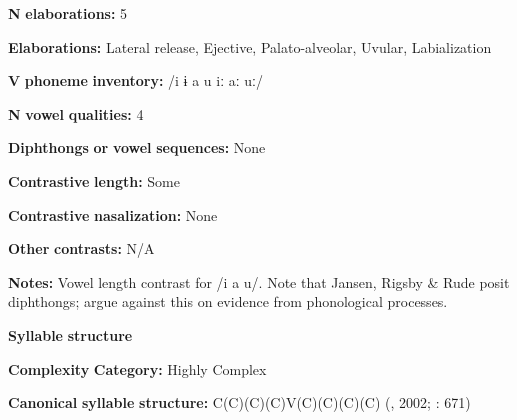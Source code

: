 \begin{styleBody}
\textbf{N} \textbf{elaborations:} 5
\end{styleBody}

\begin{styleBody}
\textbf{Elaborations:} Lateral release, Ejective, Palato-alveolar, Uvular, Labialization
\end{styleBody}

\begin{styleBody}
\textbf{V} \textbf{phoneme} \textbf{inventory:} /i ɨ a u iː aː uː/
\end{styleBody}

\begin{styleBody}
\textbf{N} \textbf{vowel} \textbf{qualities:} 4
\end{styleBody}

\begin{styleBody}
\textbf{Diphthongs} \textbf{or} \textbf{vowel} \textbf{sequences:} None
\end{styleBody}

\begin{styleBody}
\textbf{Contrastive} \textbf{length:} Some
\end{styleBody}

\begin{styleBody}
\textbf{Contrastive} \textbf{nasalization:} None
\end{styleBody}

\begin{styleBody}
\textbf{Other} \textbf{contrasts:} N/A
\end{styleBody}

\begin{styleBody}
\textbf{Notes:} Vowel length contrast for /i a u/. Note that Jansen, Rigsby \& Rude posit diphthongs; \citet{HargusBeavert2006} argue against this on evidence from phonological processes.
\end{styleBody}

\begin{styleBody}
\textbf{Syllable} \textbf{structure}
\end{styleBody}

\begin{styleBody}
\textbf{Complexity} \textbf{Category:} Highly Complex
\end{styleBody}

\begin{styleBody}
\textbf{Canonical} \textbf{syllable} \textbf{structure:} C(C)(C)(C)V(C)(C)(C)(C) (\citealt{HargusBeavert2006}, 2002; \citealt{RigsbyRude1996}: 671)
\end{styleBody}

